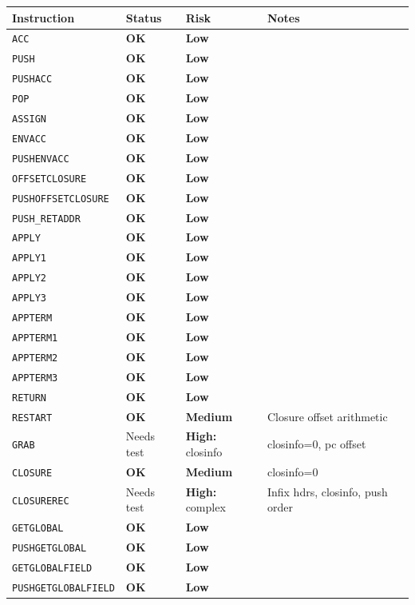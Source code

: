\documentclass[11pt,a4paper]{article}
\newcommand{\statusok}{\textbf{\textcolor{green!50!black}{OK}}\xspace}
\newcommand{\risklow}{\textcolor{green!50!black}{\textbf{Low}}\xspace}
\newcommand{\riskmed}{\textcolor{orange!80!black}{\textbf{Medium}}\xspace}
\newcommand{\riskhigh}[1]{\textcolor{red!70!black}{\textbf{High:}} #1\xspace}
\begin{document}
\begin{longtable}{llll}
\toprule
\textbf{Instruction} & \textbf{Status} & \textbf{Risk} & \textbf{Notes} \\
\midrule
\endhead
\texttt{ACC} & \statusok & \risklow & \\
\texttt{PUSH} & \statusok & \risklow & \\
\texttt{PUSHACC} & \statusok & \risklow & \\
\texttt{POP} & \statusok & \risklow & \\
\texttt{ASSIGN} & \statusok & \risklow & \\
\texttt{ENVACC} & \statusok & \risklow & \\
\texttt{PUSHENVACC} & \statusok & \risklow & \\
\texttt{OFFSETCLOSURE} & \statusok & \risklow & \\
\texttt{PUSHOFFSETCLOSURE} & \statusok & \risklow & \\
\midrule
\texttt{PUSH\_RETADDR} & \statusok & \risklow & \\
\texttt{APPLY} & \statusok & \risklow & \\
\texttt{APPLY1} & \statusok & \risklow & \\
\texttt{APPLY2} & \statusok & \risklow & \\
\texttt{APPLY3} & \statusok & \risklow & \\
\texttt{APPTERM} & \statusok & \risklow & \\
\texttt{APPTERM1} & \statusok & \risklow & \\
\texttt{APPTERM2} & \statusok & \risklow & \\
\texttt{APPTERM3} & \statusok & \risklow & \\
\texttt{RETURN} & \statusok & \risklow & \\
\midrule
\texttt{RESTART} & \statusok & \riskmed & Closure offset arithmetic \\
\texttt{GRAB} & Needs test & \riskhigh{closinfo} & closinfo=0, pc offset \\
\texttt{CLOSURE} & \statusok & \riskmed & closinfo=0 \\
\texttt{CLOSUREREC} & Needs test & \riskhigh{complex} & Infix hdrs, closinfo, push order \\
\midrule
\texttt{GETGLOBAL} & \statusok & \risklow & \\
\texttt{PUSHGETGLOBAL} & \statusok & \risklow & \\
\texttt{GETGLOBALFIELD} & \statusok & \risklow & \\
\texttt{PUSHGETGLOBALFIELD} & \statusok & \risklow & \\

\end{longtable}
\end{document}
